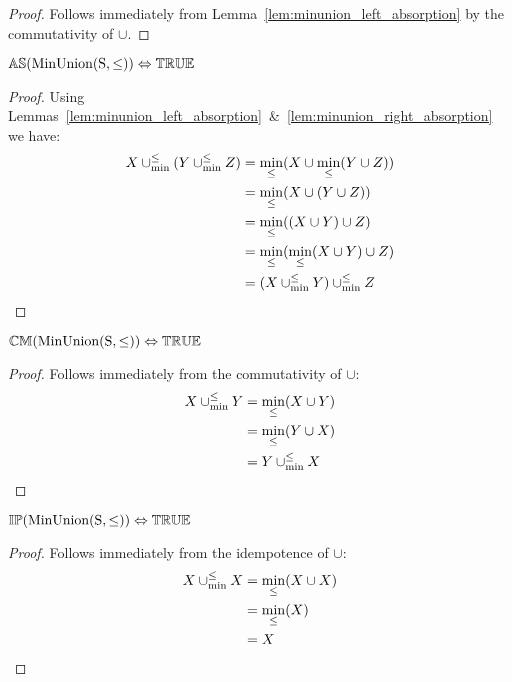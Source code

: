 \begin{proof}
Follows immediately from Lemma~\ref{lem:minunion_left_absorption} by the commutativity of $\cup$.
\end{proof}




\begin{theorem} \label{thm:minunion_as}
${\mathbb{AS}}(\mathrm{MinUnion(S,\leq)}) \Leftrightarrow {\mathbb{TRUE}}$
\end{theorem}

\begin{proof}
Using Lemmas~\ref{lem:minunion_left_absorption}~\&~\ref{lem:minunion_right_absorption} we have:
\begin{align*}
X \mathbin{\cup_{\min}^{\leq}} (Y \mathbin{\cup_{\min}^{\leq}} Z) & = \min_\leq(X \cup \min_\leq(Y \cup Z)) \\
							& = \min_\leq(X \cup (Y \cup Z)) \\
							& = \min_\leq((X \cup Y) \cup Z) \\
							& = \min_\leq(\min_\leq(X \cup Y) \cup Z) \\
							& = (X \mathbin{\cup_{\min}^{\leq}} Y) \mathbin{\cup_{\min}^{\leq}} Z
\end{align*}
\end{proof}





\begin{theorem} \label{thm:minunion_cm}
${\mathbb{CM}}(\mathrm{MinUnion(S,\leq)}) \Leftrightarrow {\mathbb{TRUE}}$
\end{theorem}

\begin{proof}
Follows immediately from the commutativity of $\cup$:
\begin{align*}
X \mathbin{\cup_{\min}^{\leq}} Y 	& = \min_\leq(X \cup Y) \\
				& = \min_\leq(Y \cup X) \\
				& = Y \mathbin{\cup_{\min}^{\leq}} X
\end{align*}
\end{proof}






\begin{theorem} \label{thm:minunion_ip}
${\mathbb{IP}}(\mathrm{MinUnion(S,\leq)}) \Leftrightarrow {\mathbb{TRUE}}$
\end{theorem}

\begin{proof}
Follows immediately from the idempotence of $\cup$:
\begin{align*}
X \mathbin{\cup_{\min}^{\leq}} X 	& = \min_\leq(X \cup X) \\
				& = \min_\leq(X) \\
				& = X
\end{align*}
\end{proof}






